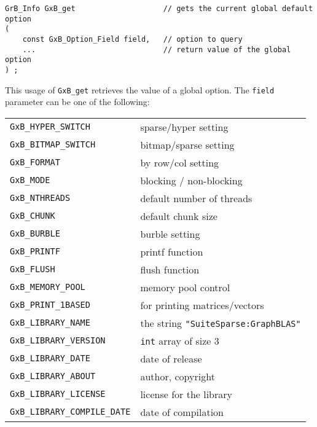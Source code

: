 \documentclass[12pt]{article}
\begin{document}
{\begin{mdframed}[userdefinedwidth=6in]
{\footnotesize
\begin{verbatim}
GrB_Info GxB_get                    // gets the current global default option
(
    const GxB_Option_Field field,   // option to query
    ...                             // return value of the global option
) ;
\end{verbatim} } \end{mdframed}

This usage of \verb'GxB_get' retrieves the value of a global option.  The
\verb'field' parameter can be one of the following:

\vspace{0.2in}
{\footnotesize
\begin{tabular}{ll}
        \hline
        \verb'GxB_HYPER_SWITCH'         & sparse/hyper setting \\
        \verb'GxB_BITMAP_SWITCH'        & bitmap/sparse setting \\
        \verb'GxB_FORMAT'               & by row/col setting \\
        \verb'GxB_MODE'                 & blocking / non-blocking \\
        \verb'GxB_NTHREADS'             & default number of threads \\
        \verb'GxB_CHUNK'                & default chunk size \\
        \verb'GxB_BURBLE'       & burble setting \\
        \verb'GxB_PRINTF'       & printf function \\
        \verb'GxB_FLUSH'        & flush function \\
        \verb'GxB_MEMORY_POOL'  & memory pool control \\
        \verb'GxB_PRINT_1BASED' & for printing matrices/vectors \\
        \hline
        \verb'GxB_LIBRARY_NAME'         & the string
                                        \verb'"SuiteSparse:GraphBLAS"' \\
        \verb'GxB_LIBRARY_VERSION'      & \verb'int' array of size 3 \\
        \verb'GxB_LIBRARY_DATE'         & date of release \\
        \verb'GxB_LIBRARY_ABOUT'        & author, copyright \\
        \verb'GxB_LIBRARY_LICENSE'      & license for the library \\
        \verb'GxB_LIBRARY_COMPILE_DATE' & date of compilation \\

\end{tabular}}}
\end{document}
